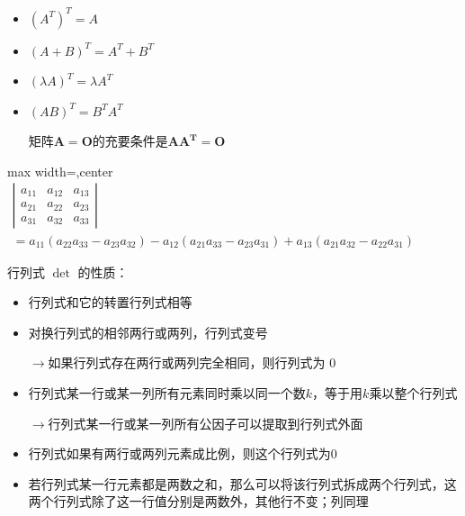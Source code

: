 \documentclass[twocolumn,10pt]{ctexart}
\begin{document}
\begin{itemize}
\item $(A^T)^T=A$
\item $(A+B)^T=A^T+B^T$
\item $(\lambda A)^T=\lambda A^T$
\item $(AB)^T=B^TA^T$

矩阵$\mathbf{A=O}$的充要条件是$\mathbf{AA^T=O}$
\end{itemize}

\begin{adjustbox}{max width=\linewidth,center}
$\begin{gathered}
\left|\begin{matrix}a_{11}&a_{12}&a_{13}\\a_{21}&a_{22}&a_{23}\\a_{31}&a_{32}&a_{33}\end{matrix}\right|\\=a_{11}(a_{22}a_{33}-a_{23}a_{32})-a_{12}(a_{21}a_{33}-a_{23}a_{31})+a_{13}(a_{21}a_{32}-a_{22}a_{31})
\end{gathered}$
\end{adjustbox}

行列式 $\det$ 的性质：

\begin{itemize}
\item 行列式和它的转置行列式相等
\end{itemize}

\begin{itemize}
\item 对换行列式的相邻两行或两列，行列式变号

$\to$如果行列式存在两行或两列完全相同，则行列式为 $0$
\end{itemize}

\begin{itemize}
\item 行列式某一行或某一列所有元素同时乘以同一个数$k$，等于用$k$乘以整个行列式

$\to$行列式某一行或某一列所有公因子可以提取到行列式外面
\end{itemize}

\begin{itemize}
\item 行列式如果有两行或两列元素成比例，则这个行列式为$0$
\end{itemize}

\begin{itemize}
\item 若行列式某一行元素都是两数之和，那么可以将该行列式拆成两个行列式，这两个行列式除了这一行值分别是两数外，其他行不变；列同理
\end{itemize}
\end{document}

